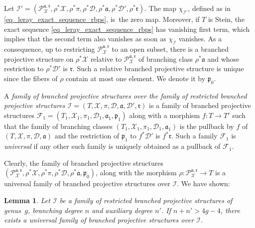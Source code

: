 \documentclass[10pt]{amsart}
\theoremstyle{definition}
\theoremstyle{plain}
\newtheorem{lemma}[definition]{Lemma}
\begin{document}
Let $\mathcal I' = \left(\mathcal P_{\mathcal X}^{\mathfrak a, \mathfrak r}, \rho^* \mathcal X, \rho^* \pi, \rho^* \mathcal D, \rho^* \mathfrak a, \rho^* \mathcal D', \rho^* \mathfrak r\right)$.
The map $\chi_{\mathcal I'}$, defined as in \eqref{eq_leray_exact_sequence_rbps}, is~the zero map.
Moreover, if $T$ is Stein, the exact sequence \eqref{eq_leray_exact_sequence_rbps} has vanishing first term, which implies that the second term also vanishes as soon as $\chi_{\mathcal I}$ vanishes.
As a consequence, up to restricting $\mathcal P_{\mathcal X}^{\mathfrak a, \mathfrak r}$ to an open subset, there is a branched projective structure on $\rho^* \mathcal X$ relative to $\mathcal P_{\mathcal X}^{\mathfrak a, \mathfrak r}$ of branching class $\rho^* \mathfrak a$ and whose restriction to $\rho^*\mathcal D'$ is $\mathfrak r$.
Such a relative branched projective structure is unique since the fibers of $\rho$ contain at most one element.
We denote it by $\mathfrak p_0$.

A \emph{family of branched projective structures over the family of restricted branched projective structures $\mathcal I = (T, \mathcal X, \pi, \mathcal D, \mathfrak a, \mathcal D', \mathfrak r)$} is a family of branched projective structures $\mathcal F_1 = (T_1, \mathcal X_1, \pi_1, \mathcal D_1, \mathfrak a_1, \mathfrak p_1)$ along with a morphism $f: T \to T'$ such that the family of branching classes $(T_1, \mathcal X_1, \pi_1, \mathcal D_1, \mathfrak a_1)$ is the pullback by $f$ of $(T, \mathcal X, \pi, \mathcal D, \mathfrak a)$ and the restriction of $\mathfrak p_1$ to $f^*\mathcal D'$ is $f^* \mathfrak r$.
Such a family $\mathcal F_1$ is \emph{universal} if any other such family is uniquely obtained as a pullback of $\mathcal F_1$.

Clearly, the family of branched projective structures $\left(\mathcal P_{\mathcal X}^{\mathfrak a, \mathfrak r}, \rho^* \mathcal X, \rho^* \pi, \rho^* \mathcal D, \rho^* \mathfrak a, \mathfrak p_0\right)$, along with the morphism $\rho: \mathcal P_{\mathcal X}^{\mathfrak a, \mathfrak r} \to T$ is a universal family of branched projective structures over $\mathcal I$.
We have shown:

\begin{lemma}
Let $\mathcal I$ be a family of restricted branched projective structures of genus~$g$, branching degree $n$ and auxiliary degree $n'$. If $n+n' > 4g-4$, there exists a universal family of branched projective structures over $\mathcal I$.
\end{lemma}
\end{document}
